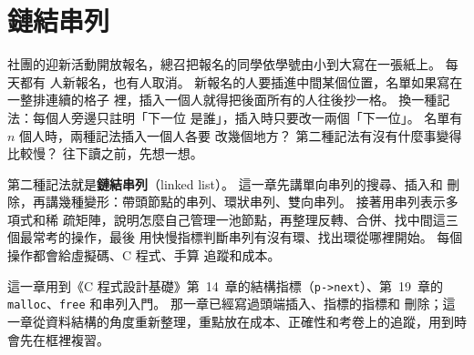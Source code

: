 \chapter{鏈結串列}
\label{ch:lists}

\newcommand{\lnode}[4][lkey]{%
    \node[#1] (#2) at (#3) {#4};
    \node[lptr, anchor=west] (#2p) at (#2.east) {};
}
\newcommand{\lnil}[1]{\draw[black!60] (#1p.south west) -- (#1p.north east);}
\newcommand{\llink}[3][lnk]{%
    \fill[black!70] (#2p.center) circle (1.1pt);
    \draw[#1] (#2p.center) #3;
}

社團的迎新活動開放報名，總召把報名的同學依學號由小到大寫在一張紙上。 每天都有
人新報名，也有人取消。 新報名的人要插進中間某個位置，名單如果寫在一整排連續的格子
裡，插入一個人就得把後面所有的人往後抄一格。 換一種記法：每個人旁邊只註明「下一位
是誰」，插入時只要改一兩個「下一位」。 名單有 $n$ 個人時，兩種記法插入一個人各要
改幾個地方？ 第二種記法有沒有什麼事變得比較慢？ 往下讀之前，先想一想。

第二種記法就是\textbf{鏈結串列}（linked list）。 這一章先講單向串列的搜尋、插入和
刪除，再講幾種變形：帶頭節點的串列、環狀串列、雙向串列。 接著用串列表示多項式和稀
疏矩陣，說明怎麼自己管理一池節點，再整理反轉、合併、找中間這三個最常考的操作，最後
用快慢指標判斷串列有沒有環、找出環從哪裡開始。 每個操作都會給虛擬碼、C 程式、手算
追蹤和成本。

這一章用到《C 程式設計基礎》第~14~章的結構指標（\texttt{p->next}）、第~19~章的
\texttt{malloc}、\texttt{free} 和串列入門。 那一章已經寫過頭端插入、指標的指標和
刪除；這一章從資料結構的角度重新整理，重點放在成本、正確性和考卷上的追蹤，用到時
會先在框裡複習。

